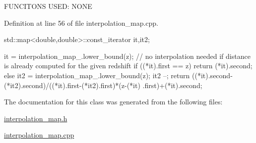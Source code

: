 F\-U\-N\-C\-I\-T\-O\-N\-S U\-S\-E\-D\-: N\-O\-N\-E

Definition at line 56 of file interpolation\-\_\-map.\-cpp.


\begin{DoxyCode}
                                                                 {
    std::map<double,double>::const_iterator it,it2;

    it = interpolation_map_.lower_bound(z);
    // no interpolation needed if distance is already computed for the given
       redshift
    if ((*it).first == z){
        return (*it).second;
    } else{
        it2 = interpolation_map_.lower_bound(z);
        it2 --;
        return ((*it).second-(*it2).second)/((*it).first-(*it2).first)*(z-(*it)
      .first)+(*it).second;
    }
}\end{DoxyCode}


The documentation for this class was generated from the following files\-:\begin{DoxyCompactItemize}
\item 
\hyperlink{interpolation__map_8h}{interpolation\-\_\-map.\-h}\item 
\hyperlink{interpolation__map_8cpp}{interpolation\-\_\-map.\-cpp}\end{DoxyCompactItemize}
